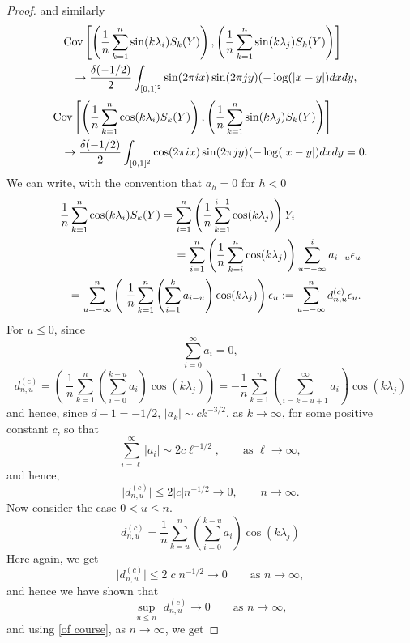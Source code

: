 \documentclass[12pt]{article}
\numberwithin{equation}{section}
\begin{document}
\begin{proof}
and similarly
\begin{eqnarray*}\lefteqn{
    \textrm{Cov}\left[\left(\frac{1}{n}\sum_{k=1}^n\sin(k\lambda_{i})S_k(Y)\right),\left(\frac{1}{n}\sum_{k=1}^n\sin(k\lambda_{j})S_k(Y)\right)\right]}\\
&&\to\frac{\delta(-1/2)}{2}\int_{[0,1]^2}\sin(2\pi ix)\sin(2\pi jy)(-\log(\vert x- y\vert)dxdy,
\end{eqnarray*}
\begin{eqnarray*}\lefteqn{
    \textrm{Cov}\left[\left(\frac{1}{n}\sum_{k=1}^n\cos(k\lambda_{i})S_k(Y)\right),\left(\frac{1}{n}\sum_{k=1}^n\sin(k\lambda_{j})S_k(Y)\right)\right]}\\
   && \to\frac{\delta(-1/2)}{2}\int_{[0,1]^2}\cos(2\pi ix)\sin(2\pi jy)(-\log(\vert x- y\vert)dxdy=0.
   \end{eqnarray*}
   We can write,   with the convention that $a_h=0$ for $h<0$
\begin{eqnarray}\lefteqn{
\frac{1}{n}\sum_{k=1}^n\cos(k\lambda_{i})S_k(Y)
=\sum_{i=1}^n\left(\frac{1}{n}\sum_{k=1}^{i-1}\cos(k\lambda_j)\right)Y_i}\label{develop}\\
&&=
\sum_{i=1}^n\left(\frac{1}{n}\sum_{k=i}^n\cos(k\lambda_j)\right)
\sum_{u=-\infty}^ia_{i-u}\epsilon_u\nonumber\\
&&=\sum_{u=-\infty}^n\left(\
\frac{1}{n}\sum_{k=1}^n\left(\sum_{i=1}^ka_{i-u}\right)\cos(k\lambda_j)\right)\epsilon_u
:=\sum_{u=-\infty}^nd^{(c)}_{n,u}\epsilon_u.\label{combine}
\end{eqnarray}
For $u\le0$,  since
$$
\sum_{i=0}^\infty a_i=0,
$$
$$
d^{(c)}_{n,u}=\left(\
\frac{1}{n}\sum_{k=1}^n\left(\sum_{i=0}^{k-u}a_i\right)\cos(k\lambda_j)\right)=
-\frac{1}{n}\sum_{k=1}^n\left(\sum_{i=k-u+1}^\infty a_i\right)\cos(k\lambda_j)
$$
and hence, since $d-1=-1/2$,  $\vert a_k\vert\sim c k^{-3/2}$, as $k\to\infty$, for some positive constant $c$,
so that
$$
\sum_{i=\ell}^\infty \vert a_i\vert \sim2c\ell^{-1/2},\qquad\textrm{as }\ell\to\infty,
$$
and hence,
$$
\vert d^{(c)}_{n,u}\vert\le 2\vert c\vert n^{-1/2}\to0,\qquad n\to\infty.
$$
Now consider the case $0<u\le n$.
$$
d^{(c)}_{n,u}=\frac{1}{n}\sum_{k=u}^n\left(\sum_{i=0}^{k-u}a_i\right)\cos(k\lambda_j)
$$
Here again, we get
$$
\vert d^{(c)}_{n,u}\vert\le 2\vert c\vert n^{-1/2}\to0\qquad\textrm{as }n\to\infty,
$$
and hence we have shown that 
\begin{equation}\label{uniform u}
   \underset{u\le n}{\sup}\,\,d^{(c)}_{n,u}\to0 \qquad\textrm{as }n\to\infty,
\end{equation}
and using \eqref{of course}, as $n\to\infty$, we get

\end{proof}
\end{document}
